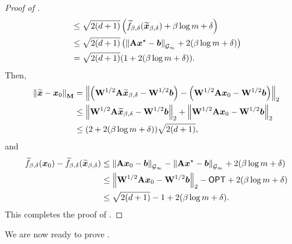 \begin{proof}[Proof of ]
\begin{align*}
     &\le \sqrt{2(d+1)}\left(\widetilde{f}_{\beta,\delta}(\widetilde{\bm{x}}_{\beta,\delta})+\beta\log m+\delta\right) \\
     &\le \sqrt{2(d+1)}\left(\left\lVert \mathbf{A}\bm{x}^{\star}-\bm{b} \right\rVert_{\mathcal{G}_{\infty}}+2(\beta\log m + \delta)\right) \\
     &= \sqrt{2(d+1)}(1+2(\beta\log m + \delta)).
\end{align*}
Then,
\begin{align*}
    \left\lVert \widetilde{\bm{x}}-\bm{x}_0 \right\rVert_{\mathbf{M}} &= \left\lVert \left(\mathbf{W}^{1/2}\mathbf{A}\widetilde{\bm{x}}_{\beta,\delta}-\mathbf{W}^{1/2}\bm{b}\right) - \left(\mathbf{W}^{1/2}\mathbf{A}\bm{x}_0-\mathbf{W}^{1/2}\bm{b}\right) \right\rVert_2 \\
    &\le\left\lVert \mathbf{W}^{1/2}\mathbf{A}\widetilde{\bm{x}}_{\beta,\delta}-\mathbf{W}^{1/2}\bm{b} \right\rVert_2 +\left\lVert \mathbf{W}^{1/2}\mathbf{A}\bm{x}_0-\mathbf{W}^{1/2}\bm{b} \right\rVert_2 \\
    &\le (2+2(\beta\log m + \delta))\sqrt{2(d+1)},
\end{align*}
and
\begin{align*}
    \widetilde{f}_{\beta,\delta}(\bm{x}_0) - \widetilde{f}_{\beta,\delta}(\widetilde{\bm{x}}_{\beta,\delta}) &\le \left\lVert \mathbf{A}\bm{x}_0-\bm{b} \right\rVert_{\mathcal{G}_{\infty}} - \left\lVert \mathbf{A}\bm{x}^{\star}-\bm{b} \right\rVert_{\mathcal{G}_{\infty}}+2(\beta\log m + \delta) \\
    &\le \left\lVert \mathbf{W}^{1/2}\mathbf{A}\bm{x}_0 - \mathbf{W}^{1/2}\bm{b} \right\rVert_2 - \mathsf{OPT}+2(\beta\log m + \delta) \\
    &\le \sqrt{2(d+1)}-1+2(\beta\log m + \delta).
\end{align*}
This completes the proof of .
\end{proof}

We are now ready to prove .

